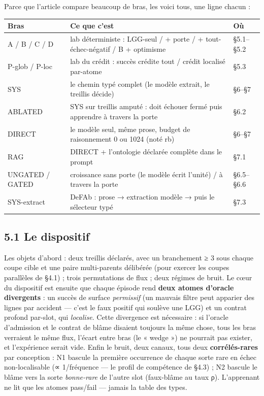 \documentclass[11pt]{article}
\begin{document}
Parce que l'article compare beaucoup de bras, les voici tous, une ligne chacun :

\begin{center}\small\begin{tabular}{lll}\toprule
Bras & Ce que c'est & Où \\ \midrule
A / B / C / D & lab déterministe : LGG-seul / + porte / + tout-échec-négatif / B + optimisme & §5.1–§5.2 \\
P-glob / P-loc & lab du crédit : succès crédite tout / crédit localisé par-atome & §5.3 \\
SYS & le chemin typé complet (le modèle extrait, le treillis décide) & §6–§7 \\
ABLATED & SYS sur treillis amputé : doit échouer fermé puis apprendre à travers la porte & §6.2 \\
DIRECT & le modèle seul, même prose, budget de raisonnement 0 ou 1024 (noté rb) & §6–§7 \\
RAG & DIRECT + l'ontologie déclarée complète dans le prompt & §7.1 \\
UNGATED / GATED & croissance sans porte (le modèle écrit l'unité) / à travers la porte & §6.5–§6.6 \\
SYS-extract & DeFAb : prose → extraction modèle → puis le sélecteur typé & §7.3 \\
\bottomrule\end{tabular}\end{center}

\subsection*{5.1 Le dispositif}

Les objets d'abord : deux treillis déclarés, avec un branchement ≥ 3 sous chaque coupe cible et une paire multi-parents délibérée (pour exercer les coupes parallèles de §4.1) ; trois permutations de flux ; deux régimes de bruit. Le cœur du dispositif est ensuite que chaque épisode rend \textbf{deux atomes d'oracle divergents} : un succès de surface \emph{permissif} (un mauvais filtre peut apparier des lignes par accident — c'est le faux positif qui soulève une LGG) et un contrat profond par-slot, qui \emph{localise}. Cette divergence est nécessaire : si l'oracle d'admission et le contrat de blâme disaient toujours la même chose, tous les bras verraient le même flux, l'écart entre bras (le « wedge ») ne pourrait pas exister, et l'expérience serait vide. Enfin le bruit, deux canaux, tous deux \textbf{corrélés-rares} par conception : N1 bascule la première occurrence de chaque sorte rare en échec non-localisable (∝ 1/fréquence — le profil de compétence de §4.3) ; N2 bascule le blâme vers la sorte \emph{bonne-rare} de l'autre slot (faux-blâme au taux ρ). L'apprenant ne lit que les atomes pass/fail — jamais la table des types.
\end{document}
